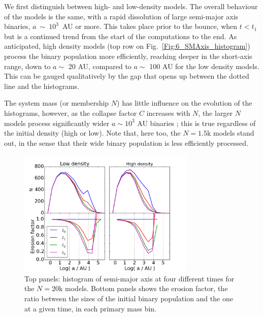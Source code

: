 We first distinguish between high- and low-density models. The overall behaviour of the models is the same, with a rapid dissolution of large semi-major axis binaries,
$a~\sim~10^3$~AU or more. This takes place prior to the bounce, when $t < t_1$ but is a continued trend from the start of the computations to the end.
As anticipated, high density models (top row on Fig.~\ref{Fig:6_SMAxis_histogram}) process the binary population more efficiently, reaching deeper in the short-axis
range, down to  $a \sim$ 20 AU, compared to $a \sim$ 100 AU for the low density models.
This can be gauged qualitatively by the gap that opens up between the dotted line and the histograms.

The system mass (or membership $N$) has little influence on the evolution of the histograms, however, as the collapse factor $C$ increases with $N$, the larger $N$ models process significantly wider $a \sim 10^3$ AU binaries ; this is true regardless of the initial density (high or low). Note that, here too, the $N = 1.5$k models stand out, in the sense that their wide binary population is less efficiently processed.
%

\begin{figure}
\begin{center}
\includegraphics[width=0.75\textwidth]{Figures/6_S_shape}
\caption[Erosion factor of semi-major axis distribution for N=20k]{Top panels: histogram of semi-major axis at four different times for the $N = 20$k  models. 
Bottom panels shows the erosion factor, the ratio between the sizes of the initial binary population and the one at a given time, in each primary mass bin. }
\label{Fig:6_S_shape}
\end{center}
\end{figure}

